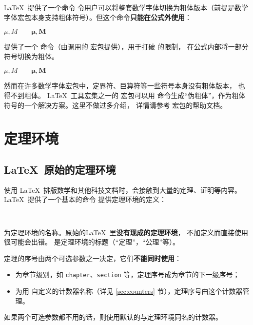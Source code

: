\LaTeX\ 提供了一个命令  令用户可以将整套数学字体切换为粗体版本（前提是数学字体宏包本身支持粗体符号）。但这个命令\textbf{只能在公式外使用}：
\begin{example}
$\mu, M \qquad
\mathbf{\mu}, \mathbf{M}$
\end{example}

 提供了一个  命令（由调用的  宏包提供），用于打破  的限制，
在公式内部将一部分符号切换为粗体。
\begin{example}
$\mu, M \qquad
\boldsymbol{\mu}, \boldsymbol{M}$
\end{example}

然而在许多数学字体宏包中，定界符、巨算符等一些符号本身没有粗体版本， 也得不到粗体。
\LaTeX\ 工具宏集之一的  宏包可以用  命令生成“伪粗体”，作为粗体符号的一个解决方案。这里不做过多介绍，
详情请参考  宏包的帮助文档。

\section{定理环境}\label{sec:theorems}

\subsection{\LaTeX\ 原始的定理环境}\label{subsec:latex-theorems}

使用 \LaTeX\ 排版数学和其他科技文档时，会接触到大量的定理、证明等内容。
\LaTeX\ 提供了一个基本的命令  提供定理环境的定义：
\begin{command}
 \\
\end{command}

 为定理环境的名称。原始的\LaTeX\ 里\textbf{没有现成的定理环境}，
不加定义而直接使用很可能会出错。 是定理环境的标题（“定理”，“公理”等）。

定理的序号由两个可选参数之一决定，它们\textbf{不能同时使用}：
\begin{itemize}
  \item {} 为章节级别，如 \texttt{chapter}、\texttt{section} 等，定理序号成为章节的下一级序号；
  \item {} 为用  自定义的计数器名称（详见 \ref{sec:counters} 节），定理序号由这个计数器管理。
\end{itemize}
如果两个可选参数都不用的话，则使用默认的与定理环境同名的计数器。

